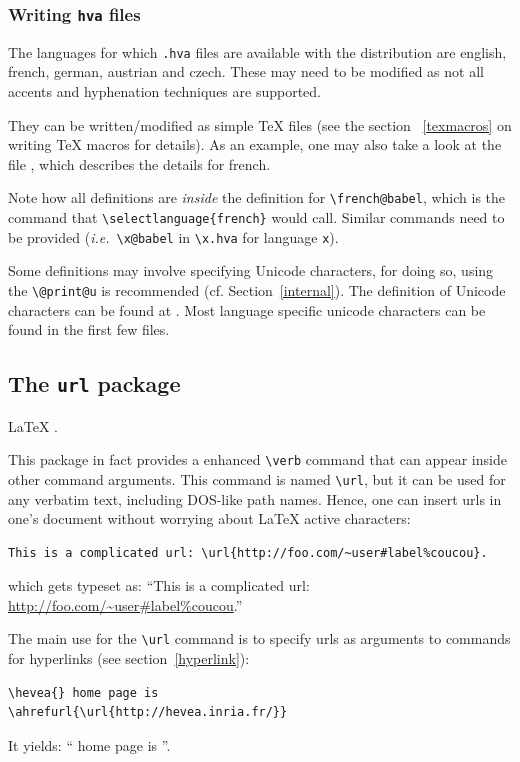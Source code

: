 \subsubsection{Writing \texttt{hva} files}

The languages for which {\tt .hva} files are available with the
distribution are english, french, german, austrian and czech. These
may need to be modified as not all accents and hyphenation techniques
are supported.

They can be written/modified as simple \TeX{} files (see the section ~\ref{texmacros} on writing \TeX{} macros for details). As an example, one may also take a look at the file , which describes the details for french. 

Note how all definitions are \emph{inside} the definition for
\verb+\french@babel+, which is the command that
\verb+\selectlanguage{french}+ would call. Similar commands need to be
provided (\emph{i.e.}\ \verb+\x@babel+ in \verb+\x.hva+ for language
\verb+x+).

Some definitions may involve specifying Unicode characters, for doing
so, using the \verb+\@print@u+ is recommended (cf. Section~\ref{internal}).
The definition of Unicode characters can be found at
.
Most language specific unicode characters can be found in the first
few files.

\subsection{The \label{urlpackage}\texttt{url} package}
%
\LaTeX{} .

This package in fact provides a enhanced  \verb+\verb+ command that
can appear inside other command arguments.
This command is named \verb+\url+,
but it can be used for any verbatim text, including DOS-like path
names.
Hence, one can insert urls in one's document without worrying about
\LaTeX{} active characters:
\begin{verbatim}
This is a complicated url: \url{http://foo.com/~user#label%coucou}.
\end{verbatim}
which gets typeset as: ``This is a complicated url: \url{http://foo.com/~user#label%coucou}.''

The main use for the \verb+\url+ command is to specify urls as arguments to
\hevea{} commands for hyperlinks (see section~\ref{hyperlink}):
\begin{verbatim}
\hevea{} home page is
\ahrefurl{\url{http://hevea.inria.fr/}}
\end{verbatim}
It yields: ``\hevea{} home page is
''.

